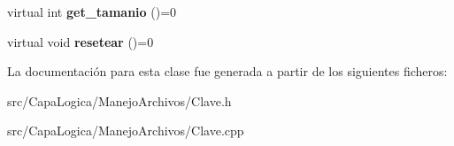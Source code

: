 \begin{DoxyCompactItemize}
\item 
\hypertarget{class_clave_a0e0231564fcfef3940aab36d6927b326}{virtual int {\bfseries get\-\_\-tamanio} ()=0}\label{class_clave_a0e0231564fcfef3940aab36d6927b326}

\item 
\hypertarget{class_clave_abedb14a307bd9812ed5ad662a50880d7}{virtual void {\bfseries resetear} ()=0}\label{class_clave_abedb14a307bd9812ed5ad662a50880d7}

\end{DoxyCompactItemize}


\-La documentación para esta clase fue generada a partir de los siguientes ficheros\-:\begin{DoxyCompactItemize}
\item 
src/\-Capa\-Logica/\-Manejo\-Archivos/\-Clave.\-h\item 
src/\-Capa\-Logica/\-Manejo\-Archivos/\-Clave.\-cpp\end{DoxyCompactItemize}
